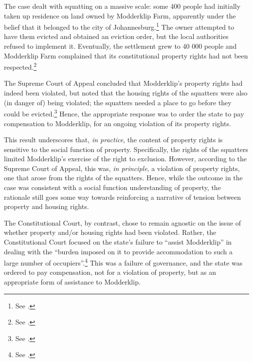 The case dealt with squatting on a massive scale: some 400 people had initially taken up residence on land owned by Modderklip Farm, apparently under the belief that it belonged to the city of Johannesburg.\footnote{See \cite[4]{modderklip05}.} The owner attempted to have them evicted and obtained an eviction order, but the local authorities refused to implement it. Eventually, the settlement grew to 40 000 people and Modderklip Farm complained that its constitutional property rights had not been respected.\footnote{See \cite[8]{modderklip05}.}

The Supreme Court of Appeal concluded that Modderklip's property rights had indeed been violated, but noted that the housing rights of the squatters were also (in danger of) being violated; the squatters needed a place to go before they could be evicted.\footnote{See \cite[21-26]{modderklip04}.} Hence, the appropriate response was to order the state to pay compensation to Modderklip, for an ongoing violation of its property rights.

This result underscores that, {\it in practice}, the content of property rights is sensitive to the social function of property. Specifically, the rights of the squatters limited Modderklip's exercise of the right to exclusion. However, according to the Supreme Court of Appeal, this was, {\it in principle}, a violation of property rights, one that arose from the rights of the squatters. Hence, while the outcome in the case was consistent with a social function understanding of property, the rationale still goes some way towards reinforcing a narrative of tension between property and housing rights.

The Constitutional Court, by contrast, chose to remain agnostic on the issue of whether property and/or housing rights had been violated. Rather, the Constitutional Court focused on the state's failure to ``assist Modderklip'' in dealing with the ``burden imposed on it to provide accommodation to such a large number of occupiers''.\footnote{See \cite[49]{modderklip05}.} This was a failure of governance, and the state was ordered to pay compensation, not for a violation of property, but as an appropriate form of assistance to Modderklip. %


